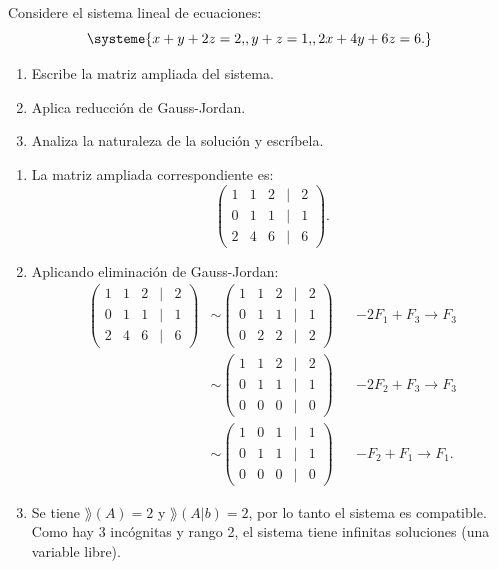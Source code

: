 \documentclass[11pt,respuestas,a4]{aleph-examen}
\begin{document}
\begin{preguntas}

\item 
    Considere el sistema lineal de ecuaciones:
    \[
        \systeme{x+y+2z=2{,}, y+z=1{,}, 2x+4y+6z=6{.}}
    \]
    \begin{enumerate}
        \item Escribe la matriz ampliada del sistema. 
        \item Aplica reducción de Gauss-Jordan.
        \item Analiza la naturaleza de la solución y escríbela.
    \end{enumerate}

\begin{respuesta}\hspace{0pt}
\begin{enumerate}
\item La matriz ampliada correspondiente es:
    \[
        \begin{pmatrix}
			 1 & 1 & 2 & | & 2 \\
			 0 & 1 & 1 & | & 1 \\
			 2 & 4 & 6 & | & 6
		\end{pmatrix}.
    \]
\item Aplicando eliminación de Gauss-Jordan:
    \begin{align*}
        \begin{pmatrix}
			1 & 1 & 2 & | & 2 \\
			0 & 1 & 1 & | & 1 \\
			2 & 4 & 6 & | & 6 
		\end{pmatrix}
        &\sim
        \begin{pmatrix}
			1 & 1 & 2 & | & 2 \\
			0 & 1 & 1 & | & 1 \\
			0 & 2 & 2 & | & 2
		\end{pmatrix} && -2F_1 + F_3 \rightarrow F_3 \\
		&\sim
		\begin{pmatrix}
			1 & 1 & 2 & | & 2 \\
			0 & 1 & 1 & | & 1 \\
			0 & 0 & 0 & | & 0
		\end{pmatrix} && -2F_2 + F_3 \rightarrow F_3 \\
		&\sim
		\begin{pmatrix}
			1 & 0 & 1 & | & 1 \\
			0 & 1 & 1 & | & 1 \\
			0 & 0 & 0 & | & 0
		\end{pmatrix} && -F_2 + F_1 \rightarrow F_1.
    \end{align*}
\item Se tiene $\rang(A)=2$ y $\rang(A|b)=2$, por lo tanto el sistema es compatible. Como hay 3 incógnitas y rango 2, el sistema tiene infinitas soluciones (una variable libre).


\end{enumerate}
\end{respuesta}
\end{preguntas}
\end{document}
